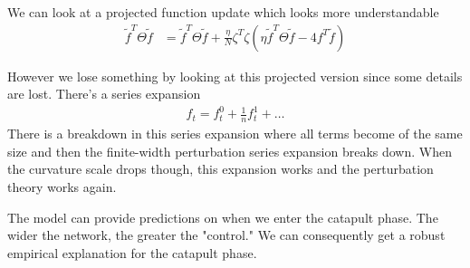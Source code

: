 \documentclass[book.tex]{subfiles}
\begin{document}
We can look at a projected function update which looks more understandable
\begin{align}
    \tilde{f}^T \Theta \tilde{f} &= \tilde{f}^T \Theta \tilde{f} + \frac{\eta}{N} \zeta^T \zeta (\eta \tilde{f}^T \Theta \tilde{f} - 4 f^T \tilde{f})
\end{align}

However we lose something by looking at this projected version since some details are lost. There's a series expansion
\begin{align}
    f_t = f_t^0 + \frac{1}{n} f_t^1 + \dotsc 
\end{align}
There is a breakdown in this series expansion where all terms become of the same size and then the finite-width perturbation series expansion breaks down. When the curvature scale drops though, this expansion works and the perturbation theory works again.

The model can provide predictions on when we enter the catapult phase. The wider the network, the greater the "control." We can consequently get a robust empirical explanation for the catapult phase.



\end{document}
